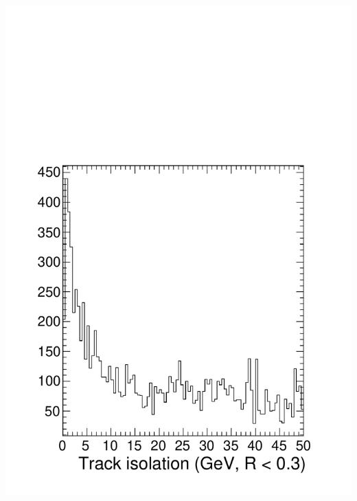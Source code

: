 \documentclass[compress]{beamer}
\begin{document}
\begin{frame}
\begin{columns}
\includegraphics[width=\linewidth]{trackiso_background.pdf}
\end{columns}
\end{frame}
\end{document}
